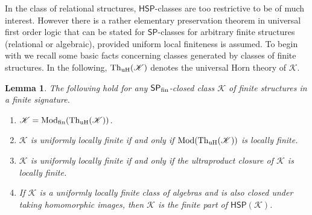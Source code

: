 \documentclass[reqno]{amsart}
\theoremstyle{plain}
\newtheorem{lem}[thm]{Lemma}
\theoremstyle{definition}
\newcommand{\Mod}{\operatorname{Mod}}
\newcommand{\Th}{\operatorname{Th}}
\begin{document}
 In the class of relational structures, $\mathsf{HSP}$-classes are too restrictive to be of much interest.  However there is a rather elementary preservation theorem in universal first order logic that can be stated for $\mathsf{SP}$-classes for arbitrary finite structures (relational or algebraic), provided uniform local finiteness is assumed.  To begin with we recall some basic facts concerning classes generated by classes of finite structures.  
 In the following, $\Th_{\rm uH}(\mathscr{K})$ denotes the universal Horn theory of $\mathscr{K}$.
\begin{lem}\label{lem:ulf}
The following hold for any $\mathsf{SP}_{\rm fin}$-closed class $\mathscr{K}$ of finite structures in a finite signature.
\begin{enumerate}
\item $\mathscr{K}=\Mod_{\rm fin}(\Th_{\rm uH}(\mathscr{K}))$.
\item $\mathscr{K}$ is uniformly locally finite if and only if  $\Mod(\Th_{\rm uH}(\mathscr{K}))$ is locally finite.
\item $\mathscr{K}$ is uniformly locally finite if and only if the ultraproduct closure of $\mathscr{K}$ is locally finite.
\item If $\mathscr{K}$ is a uniformly locally finite class of algebras and is also closed under taking homomorphic images, then $\mathscr{K}$ is the finite part of $\mathsf{HSP}(\mathscr{K})$.
\end{enumerate}
\end{lem}
\end{document}
